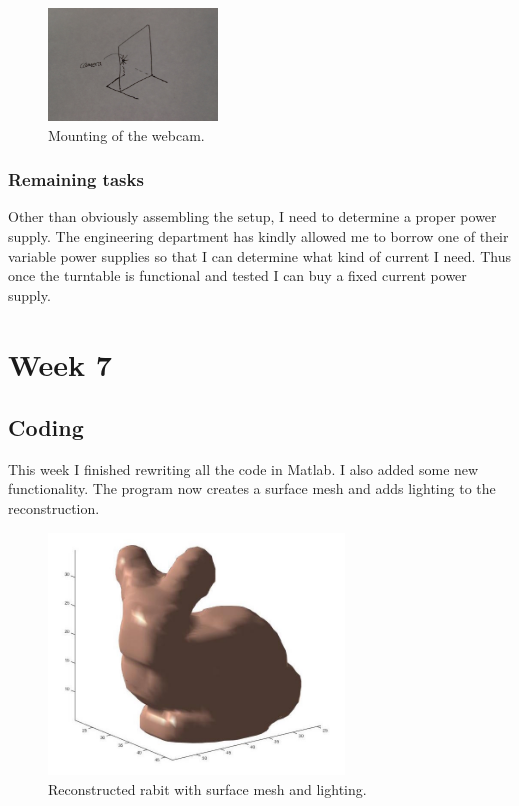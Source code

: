 \documentclass[a4paper]{article}
\begin{document}
\begin{figure}[H]
  \centering
    \includegraphics[width=0.4\textwidth]{figures/new_setup.jpg}
    \caption{Mounting of the webcam.}
  \label{fig:f2}
\end{figure}

\subsubsection{Remaining tasks}
Other than obviously assembling the setup, I need to determine a proper power supply. 
The engineering department has kindly allowed me to borrow one of their variable power supplies so that I can determine what kind of current I need.
Thus once the turntable is functional and tested I can buy a fixed current power supply.

\section{Week 7}

\subsection{Coding}
This week I finished rewriting all the code in Matlab.
I also added some new functionality.
The program now creates a surface mesh and adds lighting to the reconstruction.

\begin{figure}[H]
  \centering
    \includegraphics[width=0.7\textwidth]{figures/rabit_surface.jpg}
    \caption{Reconstructed rabit with surface mesh and lighting.}
  \label{fig:f2}
\end{figure}
\end{document}
